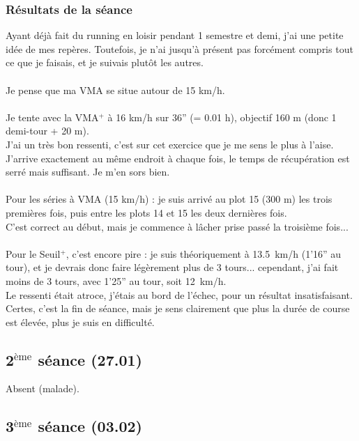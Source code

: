\documentclass{article}
\begin{document}
        \subsubsection*{Résultats de la séance}
            Ayant déjà fait du running en loisir pendant 1 semestre et demi, j'ai une petite idée de mes repères. Toutefois, je n'ai jusqu'à présent pas forcément compris tout ce que je faisais, et je suivais plutôt les autres.\\\\
            Je pense que ma VMA se situe autour de 15 km/h.\\\\
            Je tente avec la VMA$^+$ à 16 km/h sur 36'' (= 0.01 h), objectif 160 m (donc 1 demi-tour + 20 m).\\
            J'ai un très bon ressenti, c'est sur cet exercice que je me sens le plus à l'aise.\\
            J'arrive exactement au même endroit à chaque fois, le temps de récupération est serré mais suffisant. Je m'en sors bien.\\\\
            Pour les séries à VMA (15 km/h) : je suis arrivé au plot 15 (300 m) les trois premières fois, puis entre les plots 14 et 15 les deux dernières fois.\\
            C'est correct au début, mais je commence à lâcher prise passé la troisième fois...\\\\
            Pour le Seuil$^+$, c'est encore pire : je suis théoriquement à 13.5 km/h (1'16'' au tour), et je devrais donc faire légèrement plus de 3 tours... cependant, j'ai fait moins de 3 tours, avec 1'25'' au tour, soit 12 km/h.\\
            Le ressenti était atroce, j'étais au bord de l'échec, pour un résultat insatisfaisant. Certes, c'est la fin de séance, mais je sens clairement que plus la durée de course est élevée, plus je suis en difficulté.
    \subsection{2$^{\text{ème}}$ séance (27.01)}
        Absent (malade).
    
    \subsection{3$^{\text{ème}}$ séance (03.02)}
\end{document}
